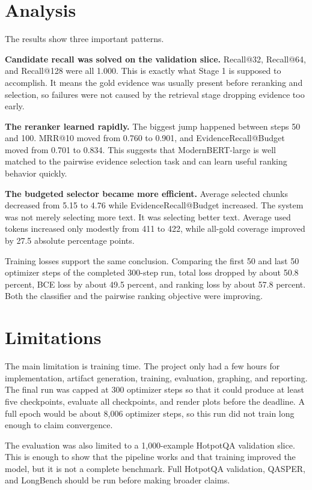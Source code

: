 \documentclass[10pt,twocolumn]{article}
\begin{document}
\section{Analysis}
The results show three important patterns.

\textbf{Candidate recall was solved on the validation slice.} Recall@32, Recall@64, and Recall@128 were all 1.000. This is exactly what Stage 1 is supposed to accomplish. It means the gold evidence was usually present before reranking and selection, so failures were not caused by the retrieval stage dropping evidence too early.

\textbf{The reranker learned rapidly.} The biggest jump happened between steps 50 and 100. MRR@10 moved from 0.760 to 0.901, and EvidenceRecall@Budget moved from 0.701 to 0.834. This suggests that ModernBERT-large is well matched to the pairwise evidence selection task and can learn useful ranking behavior quickly.

\textbf{The budgeted selector became more efficient.} Average selected chunks decreased from 5.15 to 4.76 while EvidenceRecall@Budget increased. The system was not merely selecting more text. It was selecting better text. Average used tokens increased only modestly from 411 to 422, while all-gold coverage improved by 27.5 absolute percentage points.

Training losses support the same conclusion. Comparing the first 50 and last 50 optimizer steps of the completed 300-step run, total loss dropped by about 50.8 percent, BCE loss by about 49.5 percent, and ranking loss by about 57.8 percent. Both the classifier and the pairwise ranking objective were improving.

\section{Limitations}
The main limitation is training time. The project only had a few hours for implementation, artifact generation, training, evaluation, graphing, and reporting. The final run was capped at 300 optimizer steps so that it could produce at least five checkpoints, evaluate all checkpoints, and render plots before the deadline. A full epoch would be about 8,006 optimizer steps, so this run did not train long enough to claim convergence.

The evaluation was also limited to a 1,000-example HotpotQA validation slice. This is enough to show that the pipeline works and that training improved the model, but it is not a complete benchmark. Full HotpotQA validation, QASPER, and LongBench should be run before making broader claims.
\end{document}
